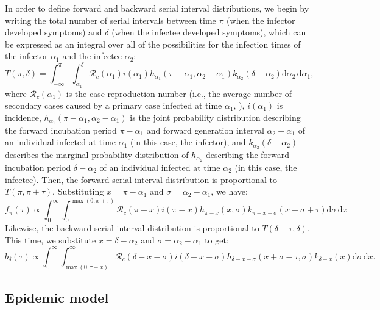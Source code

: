 \documentclass[12pt]{article}
\begin{document}
In order to define forward and backward serial interval distributions, we begin by writing the total number of serial intervals between time $\pi$ (when the infector developed symptoms) and $\delta$ (when the infectee developed symptoms), which can be expressed as an integral over all of the possibilities for the infection times of the infector $\alpha_1$ and the infectee $\alpha_2$:
\begin{equation}
T(\pi,\delta) = \int_{-\infty}^{\pi} \int_{\alpha_1}^{\delta} \mathcal R_c (\alpha_1) i(\alpha_1) h_{\alpha_1}(\pi-\alpha_1, \alpha_2 - \alpha_1) k_{\alpha_2}(\delta - \alpha_2) \mathrm{d}\alpha_2\,\mathrm{d}\alpha_1,
\end{equation}
where $\mathcal R_c(\alpha_1)$ is the case reproduction number (i.e., the average number of secondary cases caused by a primary case infected at time $\alpha_1$, \cite{fraser2007estimating}), $i(\alpha_1)$ is incidence, $h_{\alpha_1}(\pi-\alpha_1, \alpha_2 - \alpha_1)$ is the joint probability distribution describing the forward incubation period $\pi-\alpha_1$ and forward generation interval $\alpha_2 - \alpha_1$ of an individual infected at time $\alpha_1$ (in this case, the infector), and $k_{\alpha_2}(\delta-\alpha_2)$ describes the marginal probability distribution of $h_{\alpha_2}$ describing the forward incubation period $\delta-\alpha_2$ of an individual infected at time $\alpha_2$ (in this case, the infectee). 
Then, the forward serial-interval distribution is proportional to $T(\pi, \pi+\tau)$. Substituting $x=\pi-\alpha_1$ and $\sigma=\alpha_2-\alpha_1$, we have:
\begin{equation}
f_\pi(\tau) \propto \int_{0}^{\infty} \int_{0}^{\max(0,x+\tau)} \mathcal R_c (\pi-x) i(\pi-x) h_{\pi-x}(x, \sigma) k_{\pi-x+\sigma}(x-\sigma+\tau) \mathrm{d}\sigma\,\mathrm{d}x
\end{equation}
Likewise, the backward serial-interval distribution is proportional to $T(\delta-\tau, \delta)$. 
This time, we substitute $x=\delta-\alpha_2$ and $\sigma=\alpha_2-\alpha_1$ to get:
\begin{equation}
b_\delta(\tau) \propto \int_{0}^{\infty} \int_{\max(0, \tau-x)}^{\infty} \mathcal R_c (\delta-x-\sigma) i(\delta-x-\sigma) h_{\delta-x-\sigma}(x+\sigma-\tau, \sigma) k_{\delta-x}(x) \mathrm{d}\sigma\,\mathrm{d}x.
\end{equation}

\subsection{Epidemic model}
\end{document}
